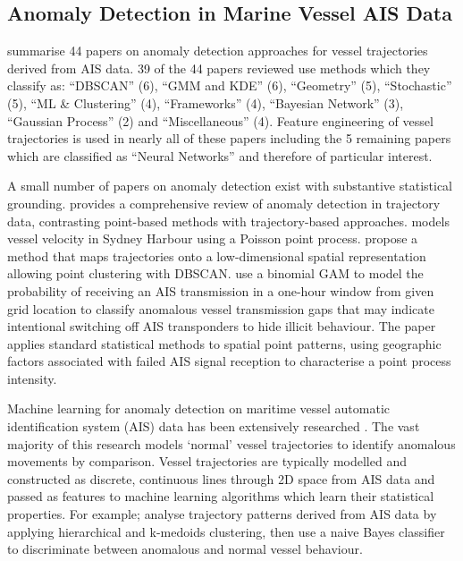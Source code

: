 \documentclass{mldsmsc}
\begin{document}
\subsection{Anomaly Detection in Marine Vessel AIS Data}

\cite{wolsing_anomaly_2022} summarise 44 papers on anomaly detection approaches for vessel trajectories derived from AIS data. 39 of the 44 papers reviewed use methods which they classify as: “DBSCAN” (6), “GMM and KDE” (6), “Geometry” (5), “Stochastic” (5), “ML \& Clustering” (4), “Frameworks” (4), “Bayesian Network” (3), “Gaussian Process” (2) and “Miscellaneous” (4). Feature engineering of vessel trajectories is used in nearly all of these papers including the 5 remaining papers which are classified as “Neural Networks” and therefore of particular interest. 

A small number of papers on anomaly detection exist with substantive statistical grounding. \cite{laxhammar2011anomaly} provides a comprehensive review of anomaly detection in trajectory data, contrasting point-based methods with trajectory-based approaches. \cite{ristic_detecting_2014} models vessel velocity in Sydney Harbour using a Poisson point process. \cite{li_spatio-temporal_2018} propose a  method that maps trajectories onto a low-dimensional spatial representation allowing  point clustering with DBSCAN. \cite{ford_detecting_2018} use a binomial GAM to model the probability of receiving an AIS transmission in a one-hour window from given grid location to classify anomalous vessel transmission gaps that may indicate intentional switching off AIS transponders to hide illicit behaviour. The paper applies standard statistical methods to spatial point patterns, using geographic factors associated with failed AIS signal reception to characterise a point process intensity. 

Machine learning for anomaly detection on maritime vessel automatic identification system (AIS) data has been extensively researched \citep{wolsing_anomaly_2022}. The vast majority of this research models ‘normal’ vessel trajectories to identify anomalous movements by comparison. Vessel trajectories are typically modelled and constructed as discrete, continuous lines through 2D space from AIS data and passed as features to machine learning algorithms which learn their statistical properties. For example; \cite{zhen_maritime_2017} analyse trajectory patterns derived from AIS data by applying hierarchical and k-medoids clustering, then use a naive Bayes classifier to discriminate between anomalous and normal vessel behaviour.
\end{document}
